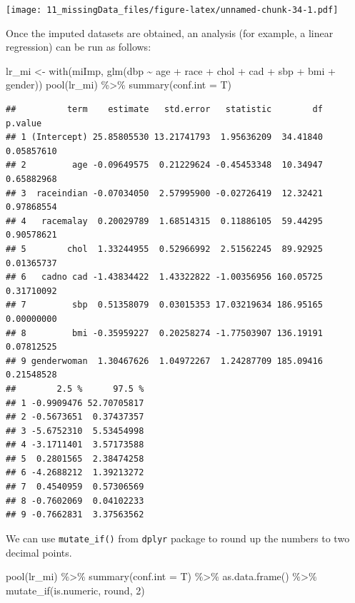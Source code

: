 \documentclass[
  10pt,
]{krantz}
\newenvironment{Shaded}{\begin{snugshade}}{\end{snugshade}}
\newcommand{\AttributeTok}[1]{\textcolor[rgb]{0.77,0.63,0.00}{#1}}
\newcommand{\DecValTok}[1]{\textcolor[rgb]{0.00,0.00,0.81}{#1}}
\newcommand{\FunctionTok}[1]{\textcolor[rgb]{0.00,0.00,0.00}{#1}}
\newcommand{\NormalTok}[1]{#1}
\newcommand{\OtherTok}[1]{\textcolor[rgb]{0.56,0.35,0.01}{#1}}
\newcommand{\SpecialCharTok}[1]{\textcolor[rgb]{0.00,0.00,0.00}{#1}}
\begin{document}
\texttt{[image: 11\_missingData\_files/figure-latex/unnamed-chunk-34-1.pdf]}

Once the imputed datasets are obtained, an analysis (for example, a linear regression) can be run as follows:

\begin{Shaded}
\begin{Highlighting}[]
\NormalTok{lr\_mi }\OtherTok{\textless{}{-}} \FunctionTok{with}\NormalTok{(miImp, }\FunctionTok{glm}\NormalTok{(dbp }\SpecialCharTok{\textasciitilde{}}\NormalTok{ age }\SpecialCharTok{+}\NormalTok{ race }\SpecialCharTok{+}\NormalTok{ chol }\SpecialCharTok{+}\NormalTok{ cad }\SpecialCharTok{+}\NormalTok{ sbp }\SpecialCharTok{+}\NormalTok{ bmi }\SpecialCharTok{+}\NormalTok{ gender))}
\FunctionTok{pool}\NormalTok{(lr\_mi) }\SpecialCharTok{\%\textgreater{}\%} 
  \FunctionTok{summary}\NormalTok{(}\AttributeTok{conf.int =}\NormalTok{ T)}
\end{Highlighting}
\end{Shaded}

\begin{verbatim}
##          term    estimate   std.error   statistic        df    p.value
## 1 (Intercept) 25.85805530 13.21741793  1.95636209  34.41840 0.05857610
## 2         age -0.09649575  0.21229624 -0.45453348  10.34947 0.65882968
## 3  raceindian -0.07034050  2.57995900 -0.02726419  12.32421 0.97868554
## 4   racemalay  0.20029789  1.68514315  0.11886105  59.44295 0.90578621
## 5        chol  1.33244955  0.52966992  2.51562245  89.92925 0.01365737
## 6   cadno cad -1.43834422  1.43322822 -1.00356956 160.05725 0.31710092
## 7         sbp  0.51358079  0.03015353 17.03219634 186.95165 0.00000000
## 8         bmi -0.35959227  0.20258274 -1.77503907 136.19191 0.07812525
## 9 genderwoman  1.30467626  1.04972267  1.24287709 185.09416 0.21548528
##        2.5 %      97.5 %
## 1 -0.9909476 52.70705817
## 2 -0.5673651  0.37437357
## 3 -5.6752310  5.53454998
## 4 -3.1711401  3.57173588
## 5  0.2801565  2.38474258
## 6 -4.2688212  1.39213272
## 7  0.4540959  0.57306569
## 8 -0.7602069  0.04102233
## 9 -0.7662831  3.37563562
\end{verbatim}

We can use \texttt{mutate\_if()} from \texttt{dplyr} package to round up the numbers to two decimal points.

\begin{Shaded}
\begin{Highlighting}[]
\FunctionTok{pool}\NormalTok{(lr\_mi) }\SpecialCharTok{\%\textgreater{}\%} 
  \FunctionTok{summary}\NormalTok{(}\AttributeTok{conf.int =}\NormalTok{ T) }\SpecialCharTok{\%\textgreater{}\%} 
  \FunctionTok{as.data.frame}\NormalTok{() }\SpecialCharTok{\%\textgreater{}\%} 
  \FunctionTok{mutate\_if}\NormalTok{(is.numeric, round, }\DecValTok{2}\NormalTok{)}
\end{Highlighting}
\end{Shaded}
\end{document}
